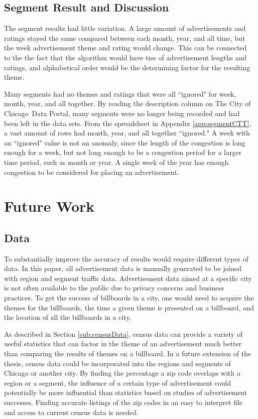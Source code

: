 \documentclass[titlepage,twocolumn]{article}
\newcommand{\CityChicago}{City of Chicago}
\begin{document}
\subsection{Segment Result and Discussion}

\par The segment results had little variation. A large amount of advertisements and ratings stayed the same compared between each month, year, and all time, but the week advertisement theme and rating would change. This can be connected to the the fact that the algorithm would have ties of advertisement lengths and ratings, and alphabetical order would be the determining factor for the resulting theme. 

\par Many segments had no themes and ratings that were all ``ignored" for week, month, year, and all together. By reading the description column on The \CityChicago\ Data Portal, many segments were no longer being recorded and had been left in the data sets.  From the spreadsheet in Appendix \ref{app:segmentCTT}, a vast amount of rows had month, year, and all together ``ignored." A week with an ``ignored" value is not an anomaly, since the length of the congestion is long enough for a week, but not long enough to be a congestion period for a larger time period, such as month or year. A single week of the year has enough congestion to be considered for placing an advertisement. 

\section{Future Work}
\label{sec:futureWork}

\subsection{Data}

To substantially improve the accuracy of results would require different types of data. In this paper, all advertisement data is manually generated to be joined with region and segment traffic data. Advertisement data aimed at a specific city is not often available to the public due to privacy concerns and business practices. To get the success of billboards in a city, one would need to acquire the themes for the billboards, the time a given theme is presented on a billboard, and the location of all the billboards in a city. 

As described in Section \ref{sub:censusData}, census data can provide a variety of useful statistics that can factor in the theme of an advertisement much better than comparing the results of themes on a billboard. In a future extension of the thesis, census data could be incorporated into the regions and segments of Chicago or another city. By finding the percentage a zip code overlaps with a region or a segment, the influence of a certain type of advertisement could potentially be more influential than statistics based on studies of advertisement successes. Finding accurate listings of the zip codes in an easy to interpret file and access to current census data is needed. 
\end{document}
